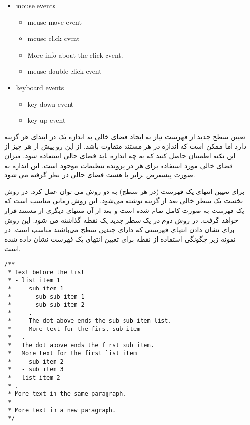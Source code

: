  \begin{latin}
    \begin{itemize}
	\item mouse events
		\begin{itemize}
			\item  mouse move event
			\item  mouse click event
			\item   More info about the click event.
			\item   mouse double click event
		\end{itemize}
	\item keyboard events
		\begin{itemize}
			\item  key down event
			\item  key up event
		\end{itemize}
  \end{itemize}
\end{latin}

\begin{note}
 تعیین  سطح جدید از فهرست نیاز به ایجاد فضای خالی به اندازه یک  در
 ابتدای هر گزینه دارد اما ممکن است که اندازه  در هر مستند متفاوت باشد.
 از این رو پیش از هر چیز از این نکته اطمینان حاصل کنید که به چه اندازه باید فضای
 خالی استفاده شود. میزان فضای خالی مورد استفاده برای هر  در پرونده
 تنظیمات موجود است. این اندازه به صورت پیشفرض برابر با هشت فضای خالی در نظر
 گرفته می شود.
\end{note}

برای تعیین انتهای یک فهرست (در هر سطح) به دو روش می توان عمل کرد. در روش نخست یک
سطر خالی بعد از گزینه نوشته می‌شود. این روش زمانی مناسب است که یک فهرست به صورت
کامل تمام شده است و بعد از آن متنهای دیگری از مستند قرار خواهد گرفت. در روش دوم
در یک سطر جدید یک نقطه گذاشته می شود.
این روش برای نشان دادن انتهای فهرستی که دارای چندین سطح می‌باشند مناسب است. در
نمونه زیر  چگونگی استفاده از نقطه برای تعیین انتهای یک فهرست نشان داده شده است.

\begin{latin}
\lstset{language=C++}  
\begin{lstlisting}[frame=single] 
/**
 * Text before the list
 * - list item 1
 *   - sub item 1
 *     - sub sub item 1
 *     - sub sub item 2
 *     . 
 *     The dot above ends the sub sub item list.
 *     More text for the first sub item
 *   .
 *   The dot above ends the first sub item.
 *   More text for the first list item
 *   - sub item 2
 *   - sub item 3
 * - list item 2
 * .
 * More text in the same paragraph.
 *
 * More text in a new paragraph.
 */
\end{lstlisting}
\end{latin}

